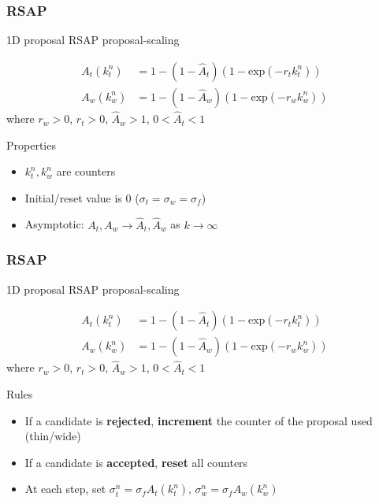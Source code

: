 \documentclass{beamer}
\begin{document}


\begin{frame}
	\frametitle{RSAP}
	
	\begin{block}{1D proposal}
		RSAP proposal-scaling
		\vspace{-15pt}
		
		\begin{equation}
			\begin{split}
				A_{t}(k_t^n) & = 1 - (1- \hat A_t)(1-\textrm{exp}(-r_t k_t^n))\\
				A_{w}(k_w^n) & = 1 - (1- \hat A_w)(1-\textrm{exp}(-r_w k_w^n))
			\end{split}
		\end{equation}
		where $r_{w}>0$, $r_{t}>0$, $\hat A_{w}>1$, $0<\hat A_{t}<1$
		
		\vspace{5pt}
		Properties
		\begin{itemize}
			\item $k_t^n, k_w^n$ are counters
			\item Initial/reset value is 0 ($\sigma_{t} = \sigma_{w} = \sigma_{f}$)
			\item Asymptotic: $A_t, A_w \rightarrow \hat A_t, \hat A_w$ as $k \rightarrow \infty$
		\end{itemize}
		
	\end{block}
\end{frame}

\begin{frame}
	\frametitle{RSAP}
	
	\begin{block}{1D proposal}
		RSAP proposal-scaling
		\vspace{-15pt}
		
		\begin{equation}
			\begin{split}
				A_{t}(k_t^n) & = 1 - (1- \hat A_t)(1-\textrm{exp}(-r_t k_t^n))\\
				A_{w}(k_w^n) & = 1 - (1- \hat A_w)(1-\textrm{exp}(-r_w k_w^n))
			\end{split}
		\end{equation}
		where $r_{w}>0$, $r_{t}>0$, $\hat A_{w}>1$, $0<\hat A_{t}<1$
		
		\vspace{5pt}
		Rules
		\begin{itemize}
			\item If a candidate is \textbf{rejected}, \textbf{increment} the counter of the proposal used (thin/wide)
			\item If a candidate is \textbf{accepted}, \textbf{reset} all counters
			\item At each step, set $\sigma_t^n = \sigma_f A_{t}(k_t^n)$, $\sigma_w^n = \sigma_f A_{w}(k_w^n)$ \\
		\end{itemize}
	\end{block}
\end{frame}
\end{document}
